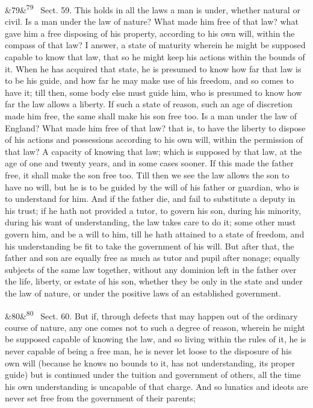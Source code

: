 \documentclass[12pt]{article}
\newcommand{\para}[1][]{\par\noindent\ifx&#1&\else\textsuperscript{\footnotesize #1}~\fi}
\begin{document}
\para[79] Sect. 59. This holds in all the laws a man is under, whether natural or civil. Is a man under the law of nature? What made him free of that law? what gave him a free disposing of his property, according to his own will, within the compass of that law? I answer, a state of maturity wherein he might be supposed capable to know that law, that so he might keep his actions within the bounds of it. When he has acquired that state, he is presumed to know how far that law is to be his guide, and how far he may make use of his freedom, and so comes to have it; till then, some body else must guide him, who is presumed to know how far the law allows a liberty. If such a state of reason, such an age of discretion made him free, the same shall make his son free too. Is a man under the law of England? What made him free of that law? that is, to have the liberty to dispose of his actions and possessions according to his own will, within the permission of that law? A capacity of knowing that law; which is supposed by that law, at the age of one and twenty years, and in some cases sooner. If this made the father free, it shall make the son free too. Till then we see the law allows the son to have no will, but he is to be guided by the will of his father or guardian, who is to understand for him. And if the father die, and fail to substitute a deputy in his trust; if he hath not provided a tutor, to govern his son, during his minority, during his want of understanding, the law takes care to do it; some other must govern him, and be a will to him, till he hath attained to a state of freedom, and his understanding be fit to take the government of his will. But after that, the father and son are equally free as much as tutor and pupil after nonage; equally subjects of the same law together, without any dominion left in the father over the life, liberty, or estate of his son, whether they be only in the state and under the law of nature, or under the positive laws of an established government.

\para[80] Sect. 60. But if, through defects that may happen out of the ordinary course of nature, any one comes not to such a degree of reason, wherein he might be supposed capable of knowing the law, and so living within the rules of it, he is never capable of being a free man, he is never let loose to the disposure of his own will (because he knows no bounds to it, has not understanding, its proper guide) but is continued under the tuition and government of others, all the time his own understanding is uncapable of that charge. And so lunatics and ideots are never set free from the government of their parents;
\end{document}
